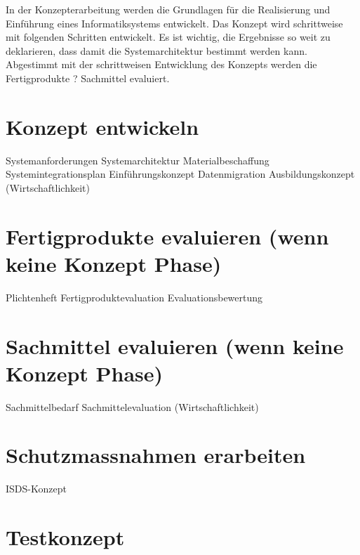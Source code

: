 In der Konzepterarbeitung werden die Grundlagen für die Realisierung und Einführung eines Informatiksystems entwickelt.
Das Konzept wird schrittweise mit folgenden Schritten entwickelt.
Es ist wichtig, die Ergebnisse so weit zu deklarieren, dass damit die Systemarchitektur bestimmt werden kann. Abgestimmt mit der schrittweisen Entwicklung des Konzepts werden die Fertigprodukte ? Sachmittel evaluiert.

\section{Konzept entwickeln}
Systemanforderungen
Systemarchitektur
Materialbeschaffung
Systemintegrationsplan
Einführungskonzept
Datenmigration
Ausbildungskonzept
(Wirtschaftlichkeit)


\section{Fertigprodukte evaluieren (wenn keine Konzept Phase)}
Plichtenheft
Fertigproduktevaluation
Evaluationsbewertung

\section{Sachmittel evaluieren (wenn keine Konzept Phase)}
Sachmittelbedarf
Sachmittelevaluation
(Wirtschaftlichkeit)

\section{Schutzmassnahmen erarbeiten}
ISDS-Konzept

\section{Testkonzept}